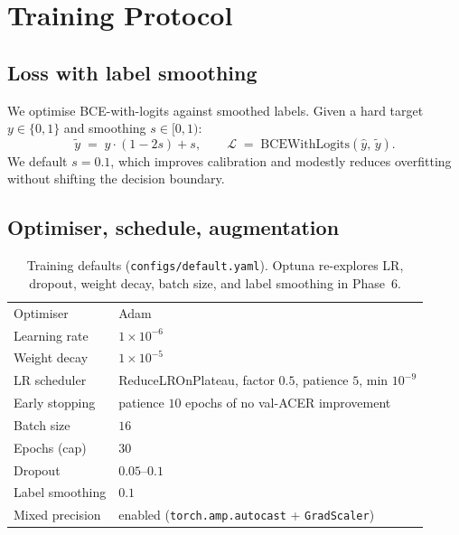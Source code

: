 \documentclass[anonymous, manuscript, screen, review]{acmart}
\begin{document}
\section{Training Protocol}
\label{sec:training}

\subsection{Loss with label smoothing}

We optimise BCE-with-logits against smoothed labels. Given a hard
target $y\in\{0,1\}$ and smoothing $s\!\in\![0,1)$:
\begin{equation}
\tilde y \;=\; y\cdot(1-2s)+s,\qquad
\mathcal{L} \;=\; \text{BCEWithLogits}(\hat y,\,\tilde y).
\end{equation}
We default $s=0.1$, which improves calibration and modestly reduces
overfitting without shifting the decision boundary.

\subsection{Optimiser, schedule, augmentation}

\begin{table}[htbp]
\centering
\caption{Training defaults (\texttt{configs/default.yaml}). Optuna
re-explores LR, dropout, weight decay, batch size, and label smoothing
in Phase~6.}
\label{tab:training-defaults}
\small
\begin{tabular}{l l}
\toprule
Optimiser & Adam \\
Learning rate & $1\!\times\!10^{-6}$ \\
Weight decay & $1\!\times\!10^{-5}$ \\
LR scheduler & ReduceLROnPlateau, factor $0{.}5$, patience $5$, min $10^{-9}$ \\
Early stopping & patience $10$ epochs of no val-ACER improvement \\
Batch size & $16$ \\
Epochs (cap) & $30$ \\
Dropout & $0{.}05$--$0{.}1$ \\
Label smoothing & $0{.}1$ \\
Mixed precision & enabled (\texttt{torch.amp.autocast} + \texttt{GradScaler}) \\
\bottomrule
\end{tabular}
\end{table}
\end{document}
